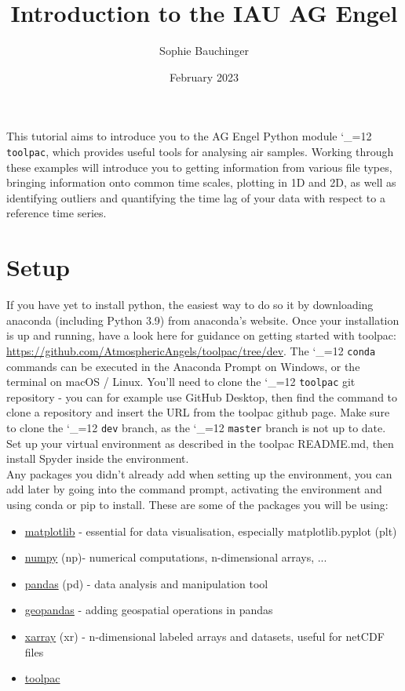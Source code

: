 \documentclass{article}
\title{Introduction to the IAU AG Engel \pyf{toolpac} }
\author{Sophie Bauchinger}
\date{February 2023}
\makeatletter
\newcommand{\pyf}{%
  \begingroup\catcode`_=12
  \pyf@
}
\newcommand{\pyf@}[1]{\texttt{#1}\endgroup}
\theoremstyle{definition}
\makeatother
\begin{document}
\maketitle

This tutorial aims to introduce you to the AG Engel Python module \pyf{toolpac}, which provides useful tools for analysing air samples. Working through these examples will introduce you to getting information from various file types, bringing information onto common time scales, plotting in 1D and 2D, as well as identifying outliers and quantifying the time lag of your data with respect to a reference time series. 

\section*{Setup}
If you have yet to install python, the easiest way to do so it by downloading anaconda (including Python 3.9) from anaconda's website. Once your installation is up and running, have a look here for guidance on getting started with toolpac: \url{https://github.com/AtmosphericAngels/toolpac/tree/dev}. The \pyf{conda} commands can be executed in the Anaconda Prompt on Windows, or the terminal on macOS / Linux. You'll need to clone the \pyf{toolpac} git repository - you can for example use GitHub Desktop, then find the command to clone a repository and insert the URL from the toolpac github page. Make sure to clone the \pyf{dev} branch, as the \pyf{master} branch is not up to date. Set up your virtual environment as described in the toolpac README.md, then install Spyder inside the environment. \\ 

Any packages you didn't already add when setting up the environment, you can add later by going into the command prompt, activating the environment and using conda or pip to install. These are some of the packages you will be using: 
\begin{itemize}[noitemsep]
\item      \href{https://matplotlib.org/stable/tutorials/introductory/quick_start.html}{matplotlib} - essential for data visualisation, especially matplotlib.pyplot (plt)
\item     \href{https://numpy.org/}{numpy} (np)- numerical computations, n-dimensional arrays, ...
\item     \href{https://pandas.pydata.org/}{pandas} (pd) - data analysis and manipulation tool
\item \href{https://geopandas.org/en/stable/}{geopandas} - adding geospatial operations in pandas
\item \href{https://xarray.dev/}{xarray} (xr) - n-dimensional labeled arrays and datasets, useful for netCDF files
\item     \href{https://github.com/AtmosphericAngels/toolpac}{toolpac}
\end{itemize}
\end{document}
